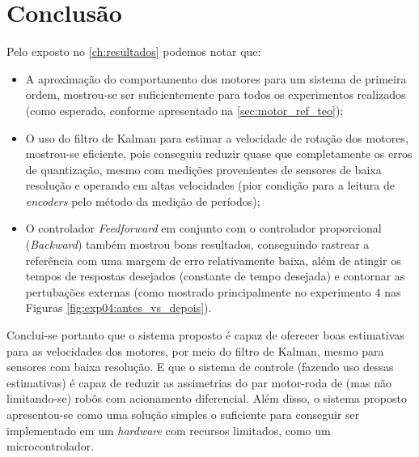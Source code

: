 \chapter[Conclusão]{Conclusão}
\label{ch:conclusao}


Pelo exposto no \autoref{ch:resultados} podemos notar que: 

\begin{itemize}
    \item A aproximação do comportamento dos motores para um sistema de primeira ordem, mostrou-se ser suficientemente para todos os experimentos realizados (como esperado, conforme apresentado na \autoref{sec:motor_ref_teo});
    \item O uso do filtro de Kalman para estimar a velocidade de rotação dos motores, mostrou-se eficiente, pois conseguiu reduzir quase que completamente os erros de quantização, mesmo com medições provenientes de sensores de baixa resolução e operando em altas velocidades (pior condição para a leitura de \emph{encoders} pelo método da medição de períodos);
    \item O controlador \emph{Feedforward} em conjunto com o controlador proporcional (\emph{Backward}) também mostrou bons resultados, conseguindo rastrear a referência com uma margem de erro relativamente baixa, além de atingir os tempos de respostas desejados (constante de tempo desejada) e contornar as pertubações externas (como mostrado principalmente no experimento 4 nas Figuras \ref{fig:exp04:antes_vs_depois}).\\
\end{itemize}


Conclui-se portanto que o sistema proposto é capaz de oferecer boas estimativas para as velocidades dos motores, por meio do filtro de Kalman, mesmo para sensores com baixa resolução. E que o sistema de controle (fazendo uso dessas estimativas) é capaz de reduzir as assimetrias do par motor-roda de (mas não limitando-se) robôs com acionamento diferencial. Além disso, o sistema proposto apresentou-se como uma solução simples o suficiente para conseguir ser implementado em um \emph{hardware} com recursos limitados, como um  microcontrolador.\\

